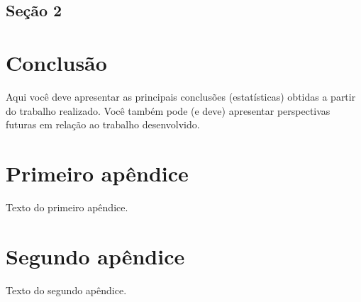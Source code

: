 \documentclass[12pt,oneside,a4paper,chapter=TITLE,
			   english,brazil]{abntex2}
\begin{document}
\section{Seção 2}


\chapter{Conclusão}

Aqui você deve apresentar as principais conclusões (estatísticas) obtidas a partir do trabalho realizado. Você também pode (e deve) apresentar perspectivas futuras em relação ao trabalho desenvolvido.


\postextual






%









% 


\begin{apendicesenv}


\chapter{Primeiro apêndice}

Texto do primeiro apêndice.


\chapter{Segundo apêndice}

Texto do segundo apêndice.

\end{apendicesenv}
\end{document}
